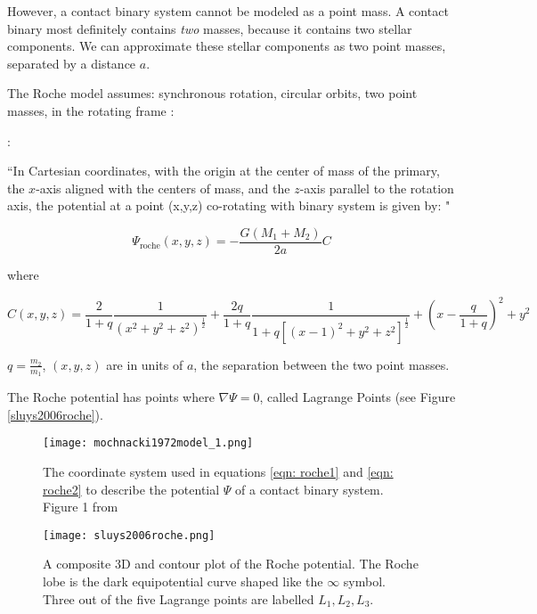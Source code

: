 \documentclass[12pt]{article} %
\numberwithin{equation}{section} %
\begin{document}
However, a contact binary system cannot be modeled as a point mass. A contact binary most definitely contains \emph{two} masses, because it contains two stellar components. We can approximate these stellar components as two point masses, separated by a distance $a$.


The Roche model assumes: synchronous rotation, circular orbits, two point masses, in the rotating frame \citep{kopal1959close} :

\citet{mochnacki1984accurate}:

``In Cartesian coordinates, with the origin at the center of mass of the primary, the $x$-axis aligned with the centers of mass, and the $z$-axis parallel to the rotation axis, the potential at a point (x,y,z) co-rotating with binary system is given by: "

\begin{equation} \label{eqn: roche1}
\Psi_{\text{roche}}(x,y,z)= -\frac{G(M_{1} + M_{2})}{2a} C
\end{equation}

where 

\begin{equation} \label{eqn: roche2}
C(x,y,z) = \frac{2}{1+q} \frac{1}{(x^{2} + y^{2} + z^{2})^{\frac{1}{2}}} + \frac{2q}{1 + q} \frac{1}{1 + q[(x -1)^{2} + y^{2} + z^{2}]^{\frac{1}{2}}} + (x - \frac{q}{1 + q})^{2} + y^{2}
\end{equation}

$q = \frac{m_{2}}{m_{1}}$, $(x,y,z)$ are in units of $a$, the separation between the two point masses.

The Roche potential has points where $\nabla \Psi = 0$, called Lagrange Points (see Figure \ref{sluys2006roche}). 

\begin{figure}[H]
\centering
\texttt{[image: mochnacki1972model\_1.png]}
\caption{The coordinate system used in equations \ref{eqn: roche1} and \ref{eqn: roche2} to describe the potential $\Psi$ of a contact binary system. Figure 1 from \citet{mochnacki1972model}}
\label{fig: mochnacki1972model_1}
\end{figure}

\begin{figure}[H]
\centering
\texttt{[image: sluys2006roche.png]}
\caption{A composite 3D and contour plot of the Roche potential. The Roche lobe is the dark equipotential curve shaped like the $\infty$ symbol. Three out of the five Lagrange points are labelled $L_{1}, L_{2}, L_{3}$.  \citep{sluys2006roche}}
\label{fig: sluys2006roche}
\end{figure}
\end{document}
